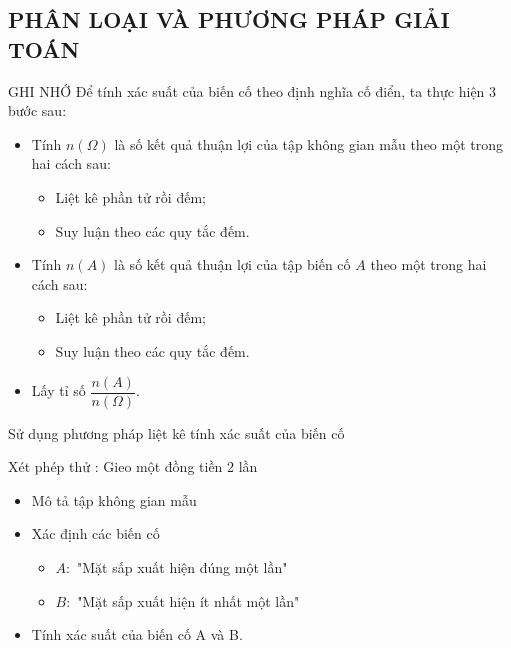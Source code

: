 \subsection{PHÂN LOẠI VÀ PHƯƠNG PHÁP GIẢI TOÁN}
\begin{khung4}{GHI NHỚ}
	Để tính xác suất của biến cố theo định nghĩa cố điển, ta thực hiện 3 bước sau:
	\begin{itemize}
		\item [\ding{172}] Tính $n(\Omega)$ là số kết quả thuận lợi của tập không gian mẫu theo một trong hai cách sau:
		\begin{itemize}
			\item [$\bullet$] Liệt kê phần tử rồi đếm;
			\item [$\bullet$] Suy luận theo các quy tắc đếm.
		\end{itemize}
		\item [\ding{173}] Tính $n(A)$ là số kết quả thuận lợi của tập biến cố $A$ theo một trong hai cách sau:
		\begin{itemize}
			\item [$\bullet$] Liệt kê phần tử rồi đếm;
			\item [$\bullet$] Suy luận theo các quy tắc đếm.
		\end{itemize}
		\item [\ding{174}] Lấy tỉ số $\dfrac{n(A)}{n(\Omega)}$.
	\end{itemize}
\end{khung4}

\begin{dang}{Sử dụng phương pháp liệt kê tính xác suất của biến cố}
\end{dang}
\begin{vd}
	Xét phép thử : Gieo một đồng tiền 2 lần
	\begin{itemize}
		\item [a)] Mô tả tập không gian mẫu
		\item [b)] Xác định các biến cố
		\begin{itemize}
			\item [$\bullet$] $A \colon$ "Mặt sấp xuất hiện đúng một lần"
			\item [$\bullet$] $B \colon$ "Mặt sấp xuất hiện ít nhất một lần"
		\end{itemize}
		\item [c)]Tính xác suất của biến cố A và B.
	\end{itemize}
\end{vd} 

